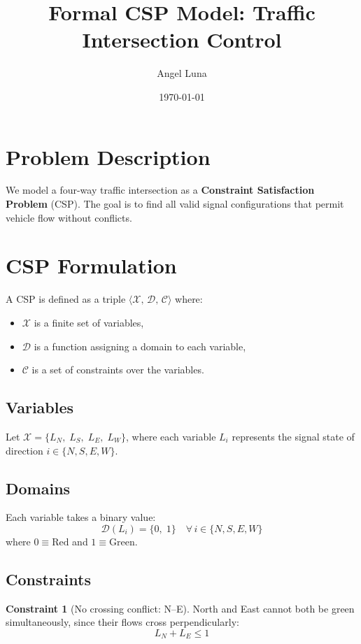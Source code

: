 \documentclass{article}
\title{Formal CSP Model: Traffic Intersection Control}
\author{Angel Luna}
\date{\today}
\theoremstyle{definition}
\newtheorem{constraint}{Constraint}
\begin{document}
\maketitle

\section{Problem Description}

We model a four-way traffic intersection as a
\textbf{Constraint Satisfaction Problem} (CSP).
The goal is to find all valid signal configurations that permit
vehicle flow without conflicts.

\section{CSP Formulation}

A CSP is defined as a triple $\langle \mathcal{X},\, \mathcal{D},\, \mathcal{C} \rangle$ where:
\begin{itemize}
  \item $\mathcal{X}$ is a finite set of variables,
  \item $\mathcal{D}$ is a function assigning a domain to each variable,
  \item $\mathcal{C}$ is a set of constraints over the variables.
\end{itemize}

\subsection{Variables}

Let $\mathcal{X} = \{L_N,\; L_S,\; L_E,\; L_W\}$, where each variable
$L_i$ represents the signal state of direction $i \in \{N, S, E, W\}$.

\subsection{Domains}

Each variable takes a binary value:
\[
  \mathcal{D}(L_i) = \{0,\; 1\} \quad \forall\, i \in \{N, S, E, W\}
\]
where $0 \equiv \text{Red}$ and $1 \equiv \text{Green}$.

\subsection{Constraints}

\begin{constraint}[No crossing conflict: N--E]
North and East cannot both be green simultaneously, since their flows
cross perpendicularly:
\[
  L_N + L_E \leq 1
\]
\end{constraint}
\end{document}
